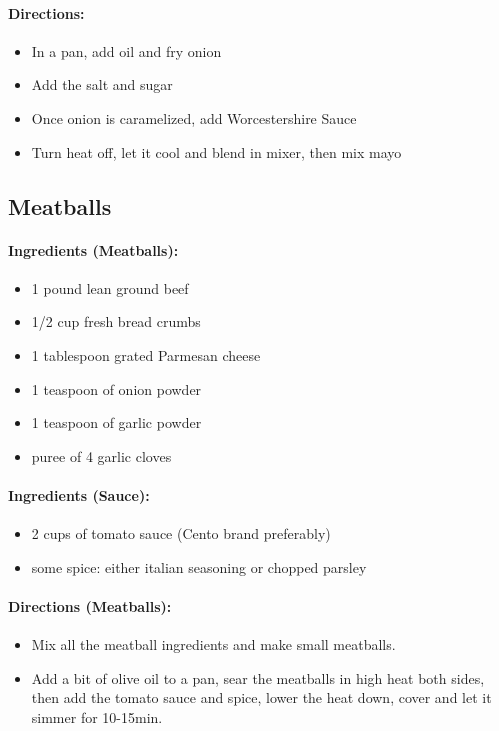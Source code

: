 \documentclass{article}
\begin{document}
\paragraph{Directions:}
\begin{itemize}
	\item In a pan, add oil and fry onion
	\item Add the salt and sugar
	\item Once onion is caramelized, add Worcestershire Sauce
	\item Turn heat off, let it cool and blend in mixer, then mix mayo
\end{itemize} 

\subsection{Meatballs}

\paragraph{Ingredients (Meatballs):}

\begin{itemize}
	\item 1 pound lean ground beef 
	\item 1/2 cup fresh bread crumbs 
	\item 1 tablespoon grated Parmesan cheese 
	\item 1 teaspoon of onion powder
	\item 1 teaspoon of garlic powder
	\item puree of 4 garlic cloves 
\end{itemize}

\paragraph{Ingredients (Sauce):}
\begin{itemize}
	\item 2 cups of tomato sauce (Cento brand preferably)
	\item some spice: either italian seasoning or chopped parsley
\end{itemize}

\paragraph{Directions (Meatballs):}
\begin{itemize}
	\item Mix all the meatball ingredients and make small meatballs.
	\item Add a bit of olive oil to a pan, sear the meatballs in high heat both sides, then add the tomato sauce and spice, lower the heat down, cover and let it simmer for 10-15min.
\end{itemize}
\end{document}
